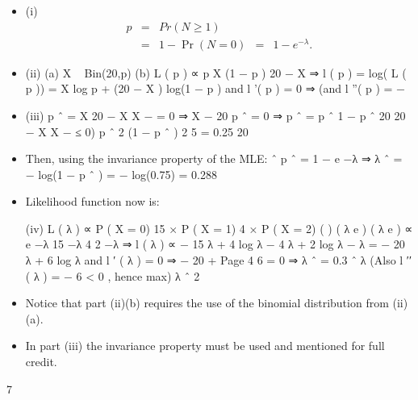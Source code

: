 \documentclass[a4paper,12pt]{article}
\begin{document}
\begin{itemize}
\item (i) \begin{eqnarray*}p &=& Pr( N \geq 1) \\ &=& 1 − \Pr( N = 0) &=& 1 − e^{−\lambda} .\end{eqnarray*}
\item (ii) (a)
X ~ Bin(20,p)
(b)
L ( p ) ∝ p X (1 − p ) 20 − X
⇒ l ( p ) = log( L ( p )) = X log p + (20 − X ) log(1 − p )
and l '( p ) = 0 ⇒
(and l ''( p ) = −
\item (iii)
p ˆ =
X 20 − X
X
−
= 0 ⇒ X − 20 p ˆ = 0 ⇒ p ˆ =
p ˆ
1 − p ˆ
20
20 − X
X
−
≤ 0)
p ˆ 2 (1 − p ˆ ) 2
5
= 0.25
20
\item Then, using the invariance property of the MLE:
ˆ
p ˆ = 1 − e −λ ⇒ λ ˆ = − log(1 − p ˆ ) = − log(0.75) = 0.288
\item Likelihood function now is:

(iv)
L ( λ ) ∝ P ( X = 0) 15 × P ( X = 1) 4 × P ( X = 2)
( ) ( λ e ) ( λ e )
∝ e −λ
15
−λ
4
2 −λ
⇒ l ( λ ) ∝ − 15 λ + 4 log λ − 4 λ + 2 log λ − λ = − 20 λ + 6 log λ
and l ′ ( λ ) = 0 ⇒ − 20 +
Page 4
6
= 0 ⇒ λ ˆ = 0.3
ˆ λ
(Also l ′′ ( λ ) = −
6
< 0 , hence max)
λ ˆ 2
\item Notice that part (ii)(b) requires the use of the binomial distribution from (ii)(a).
\item In part (iii)
the invariance property must be used and mentioned for full credit.
\end{itemize}
\newpage
7
\end{document}

